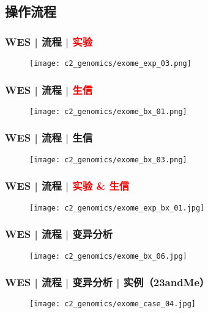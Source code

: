 \subsection{操作流程}
\begin{frame}
  \frametitle{WES | 流程 | \textcolor{red}{实验}}
  \begin{figure}
    \centering
    \texttt{[image: c2\_genomics/exome\_exp\_03.png]}
  \end{figure}
\end{frame}

\begin{frame}
  \frametitle{WES | 流程 | \textcolor{red}{生信}}
  \begin{figure}
    \centering
    \texttt{[image: c2\_genomics/exome\_bx\_01.png]}
  \end{figure}
\end{frame}

\begin{frame}
  \frametitle{WES | 流程 | 生信}
  \begin{figure}
    \centering
    \texttt{[image: c2\_genomics/exome\_bx\_03.png]}
  \end{figure}
\end{frame}

\begin{frame}
  \frametitle{WES | 流程 | \textcolor{red}{实验 \& 生信}}
  \begin{figure}
    \centering
    \texttt{[image: c2\_genomics/exome\_exp\_bx\_01.jpg]}
  \end{figure}
\end{frame}

\begin{frame}
  \frametitle{WES | 流程 | 变异分析}
  \begin{figure}
    \centering
    \texttt{[image: c2\_genomics/exome\_bx\_06.jpg]}
  \end{figure}
\end{frame}

\begin{frame}
  \frametitle{WES | 流程 | 变异分析 | 实例（23andMe）}
  \begin{figure}
    \centering
    \texttt{[image: c2\_genomics/exome\_case\_04.jpg]}
  \end{figure}
\end{frame}

